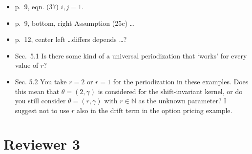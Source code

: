 \documentclass{amsart}
\begin{document}
\begin{itemize}
\item p.\ 9, eqn. (37) $i, j = 1$. 

\item p.\ 9, bottom, right Assumption (25c) \ldots 

\item p.\ 12, center left  \ldots differs depends \ldots ?  

\item Sec.\ 5.1 Is there some kind of a universal periodization that ‘works’ for every value of $r$?

\item Sec. 5.2 You take $r = 2$ or $r = 1$ for the periodization in these examples. Does this mean that $\theta = (2,\gamma)$ is considered for the shift-invariant kernel, or do you still consider $\theta = (r,\gamma)$ with $r \in \mathbb{N}$ as the unknown parameter?
I suggest not to use $r$ also in the drift term in the option pricing example.

\end{itemize}

\section*{Reviewer 3}
\end{document}
